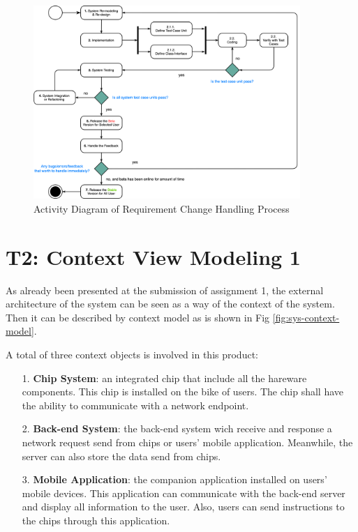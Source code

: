 \documentclass[conference]{IEEEtran}
\begin{document}
\begin{figure}[!ht]
	\centering
	\includegraphics[width=0.9\textwidth]{./img/change-handling-process.png}
	\caption{Activity Diagram of Requirement Change Handling Process}
	\label{fig:incre-process}
\end{figure}

\section{T2: Context View Modeling 1}

\textit{}

As already been presented at the submission of assignment 1,
the external architecture of the system can be seen as a way of the context of the system.
Then it can be described by context model as is shown in Fig \ref{fig:sys-context-model}.

A total of three context objects is involved in this product:

\begin{itemize}
	\item [1.] \textbf{Chip System}: an integrated chip that include all the hareware components.
	      This chip is installed on the bike of users. The chip shall have the ability to communicate with a network endpoint.
	\item [2.] \textbf{Back-end System}: the back-end system wich receive and response a network request send from chips or users' mobile application.
	      Meanwhile, the server can also store the data send from chips.
	\item [3.] \textbf{Mobile Application}: the companion application installed on users' mobile devices.
	      This application can communicate with the back-end server and display all information to the user.
	      Also, users can send instructions to the chips through this application.
\end{itemize}
\end{document}
